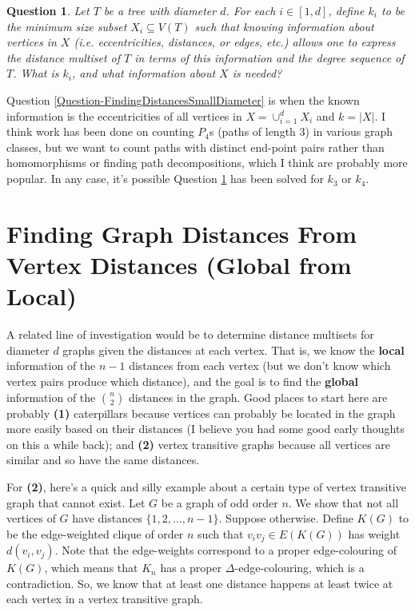 \documentclass[12]{article}
\newtheorem{question}{Question}
\theoremstyle{definition}
\begin{document}
	\begin{question}\label{Question-FindingMult(i)SmallDiameter}
		Let $T$ be a tree with diameter $d$.  For each $i \in [1,d]$, define $k_i$ to be the minimum size subset $X_i \subseteq V(T)$ such that knowing information about vertices in $X$ (\textit{i.e.} eccentricities, distances, or edges, etc.) allows one to express the distance multiset of $T$ in terms of this information and the degree sequence of $T$.  What is $k_i$, and what information about $X$ is needed?
	\end{question}

	Question \ref{Question-FindingDistancesSmallDiameter} is when the known information is the eccentricities of all vertices in $X = \cup_{i=1}^d X_i$ and $k = |X|$.  I think work has been done on counting $P_4$s (paths of length $3$) in various graph classes, but we want to count paths with distinct end-point pairs rather than homomorphisms or finding path decompositions, which I think are probably more popular.  In any case, it's possible Question \ref{Question-FindingMult(i)SmallDiameter} has been solved for $k_3$ or $k_4$.
	
	\section{Finding Graph Distances From Vertex Distances (Global from Local)} A related line of investigation would be to determine distance multisets for diameter $d$ graphs given the distances at each vertex.  That is, we know the \textbf{local} information of the $n-1$ distances from each vertex (but we don't know which vertex pairs produce which distance), and the goal is to find the \textbf{global} information of the ${n \choose 2}$ distances in the graph.  Good places to start here are probably \textbf{(1)} caterpillars because vertices can probably be located in the graph more easily based on their distances (I believe you had some good early thoughts on this a while back); and \textbf{(2)} vertex transitive graphs because all vertices are similar and so have the same distances.
	
	For \textbf{(2)}, here's a quick and silly example about a certain type of vertex transitive graph that cannot exist.  Let $G$ be a graph of odd order $n$.  We show that not all vertices of $G$ have distances $\{1, 2, \ldots, n-1\}$.  Suppose otherwise.  Define $K(G)$ to be the edge-weighted clique of order $n$ such that $v_iv_j \in E(K(G))$ has weight $d(v_i,v_j)$.  Note that the edge-weights correspond to a proper edge-colouring of $K(G)$, which means that $K_n$ has a proper $\Delta$-edge-colouring, which is a contradiction.  So, we know that at least one distance happens at least twice at each vertex in a vertex transitive graph.
	
\end{document}
